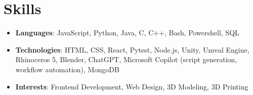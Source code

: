 \documentclass[letterpaper,11pt]{article}
\newcommand{\resumeSubHeadingListStart}{\begin{itemize}[leftmargin=*]}
\newcommand{\resumeSubHeadingListEnd}{\end{itemize}}
\begin{document}
%
\section{Skills}
    \resumeSubHeadingListStart
        \item{
            \textbf{Languages}{: JavaScript, Python, Java, C, C++, Bash, Powershell, SQL}
        }
        \item{
            \textbf{Technologies}{: HTML, CSS, React, Pytest, Node.js, Unity, Unreal Engine, Rhinoceros 5, Blender, ChatGPT, Microsoft Copilot (script generation, workflow automation), MongoDB}
        }
        \item{
            \textbf{Interests}{: Frontend Development, Web Design, 3D Modeling, 3D Printing}
        }
    \resumeSubHeadingListEnd

\end{document}
